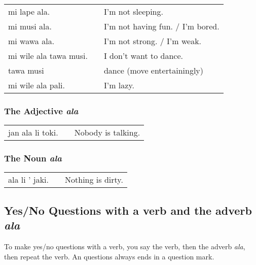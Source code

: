 \begin{supertabular}{p{5,5cm}|ll}
mi lape ala. && I'm not sleeping. \\ 
mi musi ala. && I'm not having fun. / I'm bored. \\
mi wawa ala. && I'm not strong. / I'm weak. \\
mi wile ala tawa musi. && I don't want to dance. \\
tawa musi && dance (move entertainingly) \\
mi wile ala pali. && I'm lazy. \\
\end{supertabular} 

%
\subsubsection*{The Adjective \textit{ala}}
%
%
\begin{supertabular}{p{5,5cm}|ll}
jan ala li toki. && Nobody is talking. \\
\end{supertabular} 

%
\subsubsection*{The Noun \textit{ala}}
%
%

\begin{supertabular}{p{5,5cm}|ll}
ala li ' jaki. && Nothing is dirty. \\
\end{supertabular} 

%
\subsection*{Yes/No Questions with a verb and the adverb \textit{ala}}
%

To make yes/no questions with a verb, you say the verb, then the adverb \textit{ala}, then repeat the verb. 
An questions always ends in a question mark.

